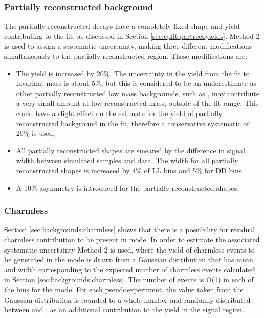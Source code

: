 \subsubsection{Partially reconstructed background}
\label{sec:systematics:partreco}

The partially reconstructed decays have a completely fixed shape and yield contributing to the \CP fit, as discussed in Section \ref{sec:cpfit:partrecoyields}. Method 2 is used to assign a systematic uncertainty, making three different modifications simultaneously to the partially reconstructed region. These modifications are:

\begin{itemize}
\item The yield is increased by 20\%. The uncertainty in the yield from the fit to \kpi invariant mass is about 5\%, but this is considered to be an underestimate as other partially reconstructed low mass backgrounds, such as \decay{\Bm}{\D\Kstarm\piz}, may contribute a very small amount at low reconstructed \Bm mass, outside of the \CP fit range. This could have a slight effect on the estimate for the yield of partially reconstructed background in the \CP fit, therefore a conservative systematic of 20\% is used,
\item All partially reconstructed shapes are smeared by the difference in signal width between simulated samples and data. The width for all partially reconstructed shapes is increased by 4\% of LL bins and 5\% for DD bins,
\item A 10\% asymmetry is introduced for the partially reconstructed shapes.
\end{itemize}

\subsubsection{Charmless}

Section \ref{sec:backgrounds:charmless} shows that there is a possibility for residual charmless contribution to be present in \pipi mode. In order to estimate the associated systematic uncertainty Method 2 is used, where the yield of charmless events to be generated in the \pipi mode is drawn from a Gaussian distribution that has mean and width corresponding to the expected number of charmless events calculated in Section \ref{sec:backgrounds:charmless}. The number of events is O(1) in each of the bins for the \pipi mode. For each pseudoexperiment, the value taken from the Gaussian distribution is rounded to a whole number and randomly distributed between \Bp and \Bm, as an additional contribution to the yield in the signal region. 

